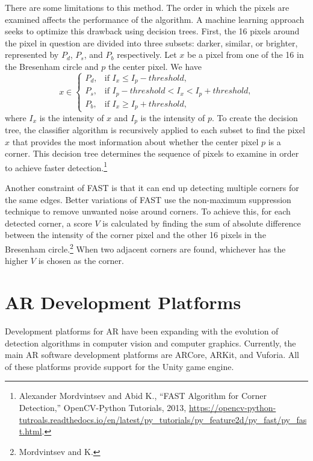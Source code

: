 There are some limitations to this method. The order in which the pixels are examined affects the performance of the algorithm. A machine learning approach seeks to optimize this drawback using decision trees. First, the 16 pixels around the pixel in question are divided into three subsets: darker, similar, or brighter, represented by $P_d$, $P_s$, and $P_b$ respectively. Let $x$ be a pixel from one of the 16 in the Bresenham circle and $p$ the center pixel. We have
\begin{equation}
x \in \begin{cases}
	P_d, & \text{if $I_x \leq I_p - threshold$,} \\
	P_s, & \text{if $I_p - threshold < I_x < I_p + threshold$,} \\
	P_b, & \text{if $I_x \geq I_p + threshold$,}
	\end{cases}
\end{equation}
where $I_x$ is the intensity of $x$ and $I_p$ is the intensity of $p$. To create the decision tree, the classifier algorithm is recursively applied to each subset to find the pixel $x$ that provides the most information about whether the center pixel $p$ is a corner. This decision tree determines the sequence of pixels to examine in order to achieve faster detection.\footnote{Alexander Mordvintsev and Abid K., “FAST Algorithm for Corner Detection,” OpenCV-Python Tutorials, 2013, \url{https://opencv-python-tutroals.readthedocs.io/en/latest/py_tutorials/py_feature2d/py_fast/py_fast.html}.}

Another constraint of FAST is that it can end up detecting multiple corners for the same edges. Better variations of FAST use the non-maximum suppression technique to remove unwanted noise around corners. To achieve this, for each detected corner, a score $V$ is calculated by finding the sum of absolute difference between the intensity of the corner pixel and the other 16 pixels in the Bresenham circle.\footnote{Mordvintsev and K.} When two adjacent corners are found, whichever has the higher $V$ is chosen as the corner.

\section{AR Development Platforms}
Development platforms for AR have been expanding with the evolution of detection algorithms in computer vision and computer graphics. Currently, the main AR software development platforms are ARCore, ARKit, and Vuforia. All of these platforms provide support for the Unity game engine.

